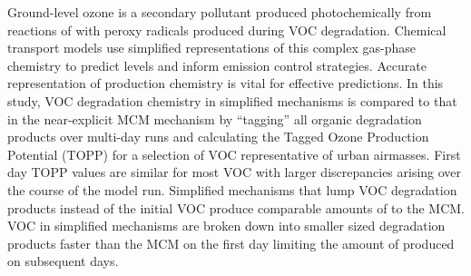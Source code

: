 Ground-level ozone is a secondary pollutant produced photochemically from reactions of  with peroxy radicals produced during VOC degradation. 
Chemical transport models use simplified representations of this complex gas-phase chemistry to predict  levels and inform emission control strategies. 
Accurate representation of  production chemistry is vital for effective predictions.
In this study, VOC degradation chemistry in simplified mechanisms is compared to that in the near-explicit MCM mechanism by ``tagging'' all organic degradation products over multi-day runs and calculating the Tagged Ozone Production Potential (TOPP) for a selection of VOC representative of urban airmasses.
First day TOPP values are similar for most VOC with larger discrepancies arising over the course of the model run.
Simplified mechanisms that lump VOC degradation products instead of the initial VOC produce comparable amounts of  to the MCM.
VOC in simplified mechanisms are broken down into smaller sized degradation products faster than the MCM on the first day limiting the amount of  produced on subsequent days.

